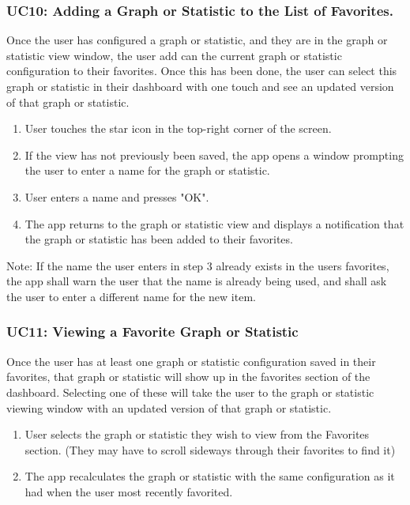 \documentclass[12pt,oneside,letterpaper]{article}
\begin{document}
\subsubsection{\label{Adding a Graph or Statistic to the List of Favorites}UC10: Adding a Graph or Statistic to the List of Favorites.}
Once the user has configured a graph or statistic, and they are in the graph or statistic view window, the user add can the current graph or statistic configuration to their favorites. Once this has been done, the user can select this graph or statistic in their dashboard with one touch and see an updated version of that graph or statistic.
\begin{enumerate}
\item User touches the star icon in the top-right corner of the screen.
\item If the view has not previously been saved, the app opens a window prompting the user to enter a name for the graph or statistic.
\item User enters a name and presses  "OK".
\item The app returns to the graph or statistic view and displays a notification that the graph or statistic has been added to their favorites.
\end{enumerate}
Note: If the name the user enters in step 3 already exists in the users favorites, the app shall warn the user that the name is already being used, and shall ask the user to enter a different name for the new item.

\renewcommand{\enumii}{\arabic{\enumii}}
\subsubsection{\label{Viewing a Favorite Graph or Statistic}UC11: Viewing a Favorite Graph or Statistic}
Once the user has at least one graph or statistic configuration saved in their favorites, that graph or statistic will show up in the favorites section of the dashboard. Selecting one of these will take the user to the graph or statistic viewing window with an updated version of that graph or statistic.
\begin{enumerate}
\item User selects the graph or statistic they wish to view from the Favorites section. (They may have to scroll sideways through their favorites to find it)
\item The app recalculates the graph or statistic with the same configuration as it had when the user most recently favorited.
\end{enumerate}
\end{document}
